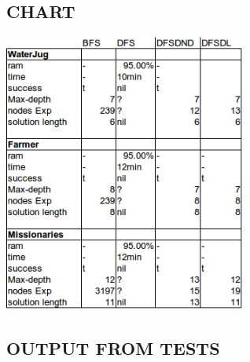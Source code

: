 \documentclass[a4paper,6pt]{article}
\begin{document}
\subsection{CHART}
\label{sec-1-1}
\includegraphics[angle=0,width=8cm]{./search_eval.png}



\subsection{OUTPUT FROM TESTS}
\label{sec-1-2}
\end{document}
